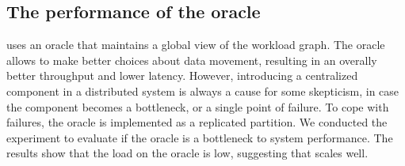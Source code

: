 
\subsection{The performance of the oracle}

\dynastar  uses an oracle that maintains a global view of the workload graph. The oracle allows
\dynastar to make better choices about data movement, resulting in an overally
better throughput and lower latency. However, introducing a centralized
component in a distributed system is always a cause for some skepticism,
in case the component becomes a bottleneck, or a single point of failure. 
To cope with failures, the oracle is implemented as a replicated partition. 
We conducted the experiment to evaluate if the \dynastar oracle is a bottleneck to
system performance. The results show that the load on the oracle is
low, suggesting that \dynastar scales well.



